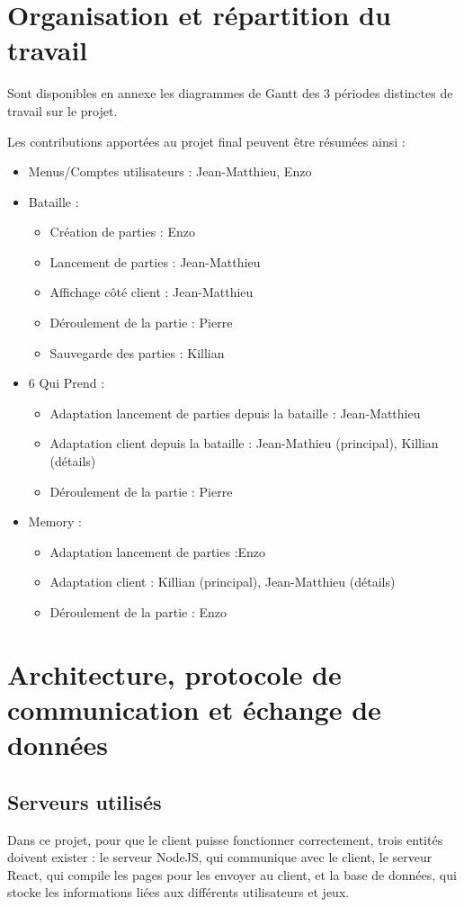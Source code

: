 \documentclass[a4paper]{article}
\begin{document}
\section{Organisation et répartition du travail}
Sont disponibles en annexe les diagrammes de Gantt des 3 périodes distinctes de travail sur le projet.

Les contributions apportées au projet final peuvent être résumées ainsi :
\begin{itemize}
    \item Menus/Comptes utilisateurs : Jean-Matthieu, Enzo
    \item Bataille :
    \begin{itemize}
        \item Création de parties : Enzo
        \item Lancement de parties :  Jean-Matthieu 
        \item Affichage côté client : Jean-Matthieu 
        \item Déroulement de la partie : Pierre
        \item Sauvegarde des parties : Killian
    \end{itemize}
    \item 6 Qui Prend :
    \begin{itemize}
        \item Adaptation lancement de parties depuis la bataille : Jean-Matthieu
        \item Adaptation client depuis la bataille :  Jean-Mathieu (principal), Killian (détails)
        \item Déroulement de la partie : Pierre
    \end{itemize}
    \item Memory :
    \begin{itemize}
        \item Adaptation lancement de parties :Enzo 
        \item Adaptation client : Killian (principal), Jean-Matthieu  (détails) 
        \item Déroulement de la partie : Enzo
    \end{itemize}
\end{itemize}

\section{Architecture, protocole de communication et échange de données}

\subsection{Serveurs utilisés} Dans ce projet, pour que le client puisse fonctionner correctement, trois entités doivent exister : le serveur NodeJS, qui communique avec le client, le serveur React, qui compile les pages pour les envoyer au client, et la base de données, qui stocke les informations liées aux différents utilisateurs et jeux.
\end{document}
